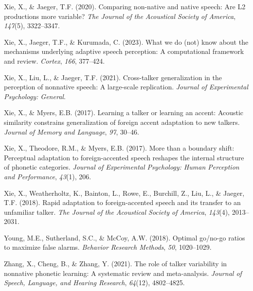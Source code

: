 \documentclass[
  12pt,
  twoside]{article}
\newlength{\cslhangindent}
\newlength{\cslentryspacingunit} %
\newenvironment{CSLReferences}[2] %
 {%
  \setlength{\parindent}{0pt}
  \ifodd #1
  \let\oldpar\par
  \def\par{\hangindent=\cslhangindent\oldpar}
  \fi
  \setlength{\parskip}{#2\cslentryspacingunit}
 }%
 {}
\begin{document}
\begin{CSLReferences}{1}{0}
\leavevmode{}%
Xie, X., \& Jaeger, T.F. (2020). Comparing non-native and native speech: Are L2 productions more variable? \emph{The Journal of the Acoustical Society of America}, \emph{147}(5), 3322--3347.

\leavevmode{}%
Xie, X., Jaeger, T.F., \& Kurumada, C. (2023). What we do (not) know about the mechanisms underlying adaptive speech perception: A computational framework and review. \emph{Cortex}, \emph{166}, 377--424.

\leavevmode{}%
Xie, X., Liu, L., \& Jaeger, T.F. (2021). Cross-talker generalization in the perception of nonnative speech: A large-scale replication. \emph{Journal of Experimental Psychology: General}.

\leavevmode{}%
Xie, X., \& Myers, E.B. (2017). Learning a talker or learning an accent: Acoustic similarity constrains generalization of foreign accent adaptation to new talkers. \emph{Journal of Memory and Language}, \emph{97}, 30--46.

\leavevmode{}%
Xie, X., Theodore, R.M., \& Myers, E.B. (2017). More than a boundary shift: Perceptual adaptation to foreign-accented speech reshapes the internal structure of phonetic categories. \emph{Journal of Experimental Psychology: Human Perception and Performance}, \emph{43}(1), 206.

\leavevmode{}%
Xie, X., Weatherholtz, K., Bainton, L., Rowe, E., Burchill, Z., Liu, L., \& Jaeger, T.F. (2018). Rapid adaptation to foreign-accented speech and its transfer to an unfamiliar talker. \emph{The Journal of the Acoustical Society of America}, \emph{143}(4), 2013--2031.

\leavevmode{}%
Young, M.E., Sutherland, S.C., \& McCoy, A.W. (2018). Optimal go/no-go ratios to maximize false alarms. \emph{Behavior Research Methods}, \emph{50}, 1020--1029.

\leavevmode{}%
Zhang, X., Cheng, B., \& Zhang, Y. (2021). The role of talker variability in nonnative phonetic learning: A systematic review and meta-analysis. \emph{Journal of Speech, Language, and Hearing Research}, \emph{64}(12), 4802--4825.

\end{CSLReferences}
\end{document}
